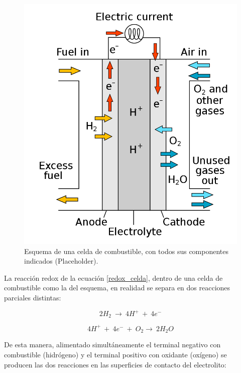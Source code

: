 \begin{figure}[h]
    \centering
    \includegraphics[scale=0.35]{Imagenes/Fuel Cell.png}
    \caption{Esquema de una celda de combustible, con todos sus componentes indicados (Placeholder).}
    \label{fuel_cell}
\end{figure}

La reacción redox de la ecuación \ref{redox_celda}, dentro de una celda de combustible como la del esquema, en realidad se separa en dos reacciones parciales distintas:

\begin{equation}\label{redox_anodo}
    2H_2\ \longrightarrow\ 4H^{+}\ +\ 4e^-
\end{equation}

\begin{equation}\label{redox_catodo}
    4H^{+}\ +\ 4e^-\ +\ O_2\longrightarrow\ 2H_2O
\end{equation}

De esta manera, alimentado simultáneamente el terminal negativo con combustible (hidrógeno) y el terminal positivo con oxidante (oxígeno) se producen las dos reacciones en las superficies de contacto del electrolito:

